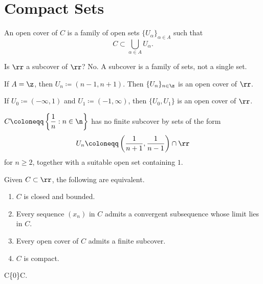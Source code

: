 
\section{Compact Sets}


\begin{definition}
    An open cover of $C$ is a family of open sets $\{U_\alpha\}_{\alpha\in A}$ such that
    \[
        C\subset \bigcup_{\alpha\in A} U_\alpha.
    \]
\end{definition}

\begin{example}
    Is $\rr$ a subcover of $\rr$? No.
    A subcover is a family of sets, not a single set.
\end{example}

\begin{example}
    If $A = \z$, then $U_n \coloneqq (n-1, n+1)$.
    Then $\{U_n\}_{n\in\z}$ is an open cover of $\rr$.
\end{example}

\begin{example}
    If $U_0 \coloneqq (-\infty, 1)$ and $U_1 \coloneqq (-1,\infty)$, then $\{U_0,U_1\}$ is an open cover of $\rr$.
\end{example}

\begin{example}
    $C\coloneqq\left\{\dfrac{1}{n} : n\in\n\right\}$ has no finite subcover by sets of the form
    \[
        U_n \coloneqq \left(\dfrac{1}{n+1}, \dfrac{1}{n-1}\right)\cap \rr
    \]
    for $n\geq 2$, together with a suitable open set containing $1$.
\end{example}

\begin{theorem}
    Given $C\subset\rr$, the following are equivalent.
    \begin{enumerate}
        \item $C$ is closed and bounded.
        \item Every sequence $(x_n)$ in $C$ admits a convergent subsequence whose limit lies in $C$.
        \item Every open cover of $C$ admits a finite subcover.
        \item $C$ is compact.
    \end{enumerate}
\end{theorem}

\begin{example}
    C\uptick \coloneqq \{0\}\cup C.
\end{example}
